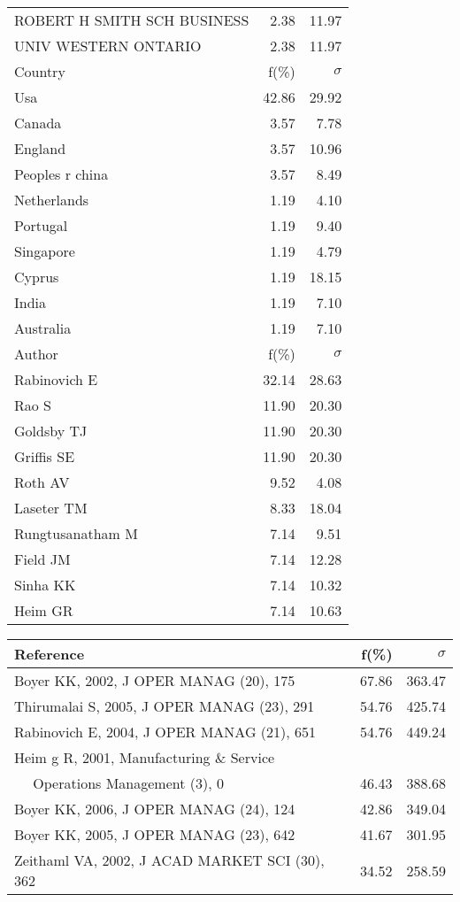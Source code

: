 \documentclass[a4paper,11pt]{report}
\begin{document}
\begin{landscape}
\begin{table}[!ht]
{\begin{tabular}{|l r r|}
ROBERT H SMITH SCH BUSINESS & 2.38 & 11.97\\
UNIV WESTERN ONTARIO & 2.38 & 11.97\\
\hline
\hline
Country & f(\%) & $\sigma$\\
\hline
Usa & 42.86 & 29.92\\
Canada & 3.57 & 7.78\\
England & 3.57 & 10.96\\
Peoples r china & 3.57 & 8.49\\
Netherlands & 1.19 & 4.10\\
Portugal & 1.19 & 9.40\\
Singapore & 1.19 & 4.79\\
Cyprus & 1.19 & 18.15\\
India & 1.19 & 7.10\\
Australia & 1.19 & 7.10\\
\hline
\hline
Author & f(\%) & $\sigma$\\
\hline
Rabinovich E & 32.14 & 28.63\\
Rao S & 11.90 & 20.30\\
Goldsby TJ & 11.90 & 20.30\\
Griffis SE & 11.90 & 20.30\\
Roth AV & 9.52 & 4.08\\
Laseter TM & 8.33 & 18.04\\
Rungtusanatham M & 7.14 & 9.51\\
Field JM & 7.14 & 12.28\\
Sinha KK & 7.14 & 10.32\\
Heim GR & 7.14 & 10.63\\
\hline
\end{tabular}
}
{\scriptsize\begin{tabular}{|l r r|}
\hline
Reference & f(\%) & $\sigma$\\
\hline
Boyer KK, 2002, J OPER MANAG (20), 175 & 67.86 & 363.47\\
Thirumalai S, 2005, J OPER MANAG (23), 291 & 54.76 & 425.74\\
Rabinovich E, 2004, J OPER MANAG (21), 651 & 54.76 & 449.24\\
Heim g R, 2001, Manufacturing \& Service &  & \\
$\quad$ Operations Management (3), 0 & 46.43 & 388.68\\
Boyer KK, 2006, J OPER MANAG (24), 124 & 42.86 & 349.04\\
Boyer KK, 2005, J OPER MANAG (23), 642 & 41.67 & 301.95\\
Zeithaml VA, 2002, J ACAD MARKET SCI (30), 362 & 34.52 & 258.59\\

\end{tabular}}
\end{table}
\end{landscape}
\end{document}
